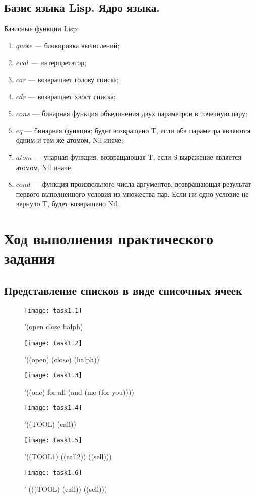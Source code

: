 \documentclass[a4paper, 14pt, unknownkeysallowed]{extreport}
\begin{document}
\section{Базис языка Lisp. Ядро языка.}
Базисные функции Lisp:
\begin{enumerate}
	\item $quote$ --- блокировка вычислений;
	\item $eval$ --- интерпретатор;
	\item $car$ --- возвращает голову списка;
	\item $cdr$ --- возвращает хвост списка;
	\item $cons$ --- бинарная функция объединения двух параметров в точечную пару;
	\item $eq$ --- бинарная функция; будет возвращено T, если оба параметра являются одним и тем же атомом, Nil иначе;
	\item $atom$ --- унарная функция, возвращающая T, если S-выражение является атомом, Nil иначе.
	\item $cond$ --- функция произвольного числа аргументов, возвращающая результат первого выполненного условия из множества пар. Если ни одно условие не вернуло T, будет возвращено Nil.
\end{enumerate}

\chapter{Ход выполнения практического задания}
\section{Представление списков в виде списочных ячеек}

\begin{figure}[!ht]
	\texttt{[image: task1.1]}
	\caption{'(open close halph)}
\end{figure}
\begin{figure}[!ht]
	\texttt{[image: task1.2]}
	\caption{'((open) (close) (halph))}
\end{figure}
\begin{figure}[!ht]
\texttt{[image: task1.3]}
\caption{'((one) for all (and (me (for you))))}
\end{figure}
\begin{figure}[!ht]
	\texttt{[image: task1.4]}
	\caption{'((TOOL) (call))}
\end{figure}
\begin{figure}[!ht]
	\texttt{[image: task1.5]}
	\caption{'((TOOL1) ((call2)) ((sell)))}
\end{figure}
\begin{figure}[!ht]
	\texttt{[image: task1.6]}
	\caption{' (((TOOL) (call)) ((sell)))}
\end{figure}
\end{document}
